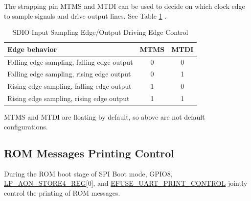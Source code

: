 \documentclass[main\_\_EN.tex]{subfiles}
\begin{document}
The strapping pin MTMS and MTDI can be used to decide on which clock edge to sample signals and drive output lines. See Table \ref{tab:bootctrl-sdio-strapping} .

\begin{table}[H]
    \centering
    \caption{SDIO Input Sampling Edge/Output Driving Edge Control}
   \label{tab:bootctrl-sdio-strapping}

    \begin{threeparttable}
    \begin{tabular}{ | l | c | c| }
    \hline
        \rowcolor{lightgray}
        \textbf{Edge behavior} & \textbf{MTMS\tnote{1}} & \textbf{MTDI\tnote{1}} \\\hline

        Falling edge sampling, falling edge output & 0 & 0 \\\hline
        Falling edge sampling, rising edge output & 0 & 1 \\\hline
        Rising edge sampling, falling edge output & 1 & 0 \\\hline
        Rising edge sampling, rising edge output & 1 & 1 \\\hline
        \end{tabular}

        \begin{tablenotes}
            \item[1] MTMS and MTDI are floating by default, so above are not default configurations.
        \end{tablenotes}

     \end{threeparttable}
\end{table}


\subsection{ROM Messages Printing Control}

During the ROM boot stage of SPI Boot mode, GPIO8, \hyperref[regdesc:LPAONSTORENREG]{LP\_AON\_STORE4\_REG}[0], and \hyperref[fielddesc:EFUSEUARTPRINTCONTROL]{EFUSE\_UART\_PRINT\_CONTROL} jointly control the printing of ROM messages.
\end{document}
